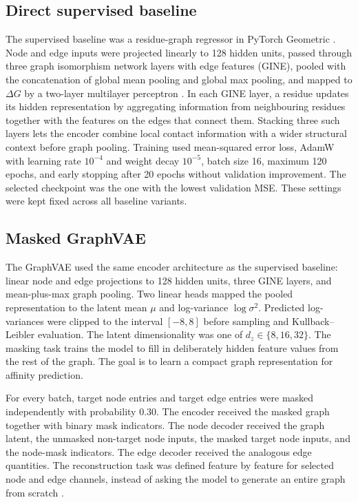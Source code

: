 \subsection{Direct supervised baseline}

The supervised baseline was a residue-graph regressor in PyTorch Geometric \citep{Fey2019PyG}. Node and edge inputs were projected linearly to 128 hidden units, passed through three graph isomorphism network layers with edge features (GINE), pooled with the concatenation of global mean pooling and global max pooling, and mapped to $\Delta G$ by a two-layer multilayer perceptron \citep{Xu2019GIN,Hu2020Pretraining}. In each GINE layer, a residue updates its hidden representation by aggregating information from neighbouring residues together with the features on the edges that connect them. Stacking three such layers lets the encoder combine local contact information with a wider structural context before graph pooling. Training used mean-squared error loss, AdamW with learning rate $10^{-4}$ and weight decay $10^{-5}$, batch size 16, maximum 120 epochs, and early stopping after 20 epochs without validation improvement. The selected checkpoint was the one with the lowest validation MSE. These settings were kept fixed across all baseline variants.

\subsection{Masked GraphVAE}

The GraphVAE used the same encoder architecture as the supervised baseline: linear node and edge projections to 128 hidden units, three GINE layers, and mean-plus-max graph pooling. Two linear heads mapped the pooled representation to the latent mean $\mu$ and log-variance $\log\sigma^2$. Predicted log-variances were clipped to the interval $[-8,8]$ before sampling and Kullback--Leibler evaluation. The latent dimensionality was one of $d_z \in \{8,16,32\}$. The masking task trains the model to fill in deliberately hidden feature values from the rest of the graph. The goal is to learn a compact graph representation for affinity prediction.

For every batch, target node entries and target edge entries were masked independently with probability 0.30. The encoder received the masked graph together with binary mask indicators. The node decoder received the graph latent, the unmasked non-target node inputs, the masked target node inputs, and the node-mask indicators. The edge decoder received the analogous edge quantities. The reconstruction task was defined feature by feature for selected node and edge channels, instead of asking the model to generate an entire graph from scratch \citep{Kipf2016VGAE,Simonovsky2018GraphVAE}.

